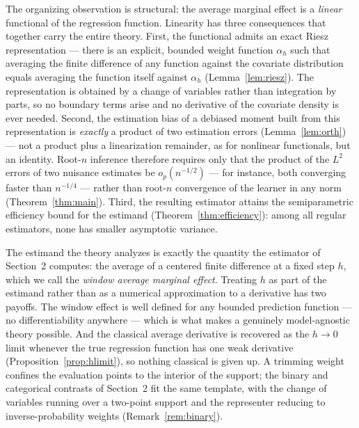 \documentclass[12pt]{article}
\begin{document}
	The organizing observation is structural: the average marginal effect is a
	\emph{linear} functional of the regression function. Linearity has three
	consequences that together carry the entire theory. First, the functional admits an
	exact Riesz representation --- there is an explicit, bounded weight function
	$\alpha_h$ such that averaging the finite difference of any function against the
	covariate distribution equals averaging the function itself against $\alpha_h$
	(Lemma~\ref{lem:riesz}). The representation is obtained by a change of variables
	rather than integration by parts, so no boundary terms arise and no derivative of
	the covariate density is ever needed. Second, the estimation bias of a debiased
	moment built from this representation is \emph{exactly} a product of two estimation
	errors (Lemma~\ref{lem:orth}) --- not a product plus a linearization remainder, as
	for nonlinear functionals, but an identity. Root-$n$ inference therefore requires
	only that the product of the $L^2$ errors of two nuisance estimates be
	$o_p(n^{-1/2})$ --- for instance, both converging faster than $n^{-1/4}$ --- rather
	than root-$n$ convergence of the learner in any norm
	(Theorem~\ref{thm:main}). Third, the resulting estimator attains the semiparametric
	efficiency bound for the estimand (Theorem~\ref{thm:efficiency}): among all regular
	estimators, none has smaller asymptotic variance.
	
	The estimand the theory analyzes is exactly the quantity the estimator of Section~2
	computes: the average of a centered finite difference at a fixed step $h$, which we
	call the \emph{window average marginal effect}. Treating $h$ as part of the estimand
	rather than as a numerical approximation to a derivative has two payoffs. The window
	effect is well defined for any bounded prediction function --- no differentiability
	anywhere --- which is what makes a genuinely model-agnostic theory possible. And the
	classical average derivative is recovered as the $h \to 0$ limit whenever the true
	regression function has one weak derivative (Proposition~\ref{prop:hlimit}), so
	nothing classical is given up. A trimming weight confines the evaluation points to
	the interior of the support; the binary and categorical contrasts of Section~2 fit
	the same template, with the change of variables running over a two-point support and
	the representer reducing to inverse-probability weights
	(Remark~\ref{rem:binary}).
	
\end{document}
